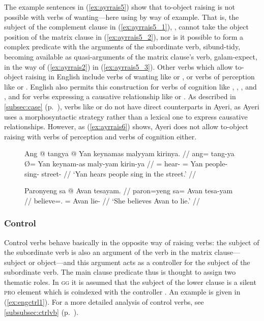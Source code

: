 The example sentences in (\ref{ex:ayrrais5}) show that to-object raising is not
possible with verbs of wanting---here using  by way
of example. That is, the subject of the complement clause in
(\ref{ex:ayrrais5_1}), , cannot take the object position of
the matrix clause in (\ref{ex:ayrrais5_2}), nor is it possible to form a
complex predicate with the arguments of the subordinate verb, 
{sibund-}{tidy}, becoming available as quasi-arguments of the matrix clause's
verb,  {galam-}{expect}, in the way of (\ref{ex:ayrrais2}) in
(\ref{ex:ayrrais5_3}). Other verbs which allow to-object raising in English
include verbs of wanting like  or , or verbs of perception
like  or . English also permits this construction for verbs of
cognition like , , , and , and for
verbs expressing a causative relationship like  or . As
described in \autoref{subsec:case} (p.~\pageref{subsubsec:causative}), verbs
like  or  do not have direct counterparts in Ayeri, as Ayeri
uses a morphosyntactic strategy rather than a lexical one to express causative
relationships. However, as (\ref{ex:ayrrais6}) shows, Ayeri does not allow
to-object raising with verbs of perception and verbs of cognition either.

\begin{figure}
\pex\label{ex:ayrrais6}
\a\label{ex:ayrrais6_1}\ljudge*\begingl
	\gla Ang @ tangya {} @ Yan keynamas malyyam kirinya. //
	\glb ang= tang-ya Ø= Yan keynam-as maly-yam kirin-ya //
	\glc \Aarg{}= hear-\TsgM{} \Top{}= Yan people-\Parg{} sing-\Ptcp{}
		street-\Loc {} //
	\glft `Yan hears people sing in the street.' //
\endgl

\a\label{ex:ayrrais6_2}\ljudge*\begingl
	\gla Paronyeng sa @ Avan tesayam. //
	\glb paron=yeng sa= Avan tesa-yam //
	\glc believe=\TsgF{}.\Aarg{} \Parg{}= Avan lie-\Ptcp{} //
	\glft `She believes Avan to lie.' //
\endgl
\xe
\end{figure}

\subsubsection{Control}
\label{subsubsec:control}

Control verbs behave basically in the opposite way of raising verbs: the
subject of the subordinate verb is also an argument of the verb in the matrix
clause---subject or object---and this argument acts as a controller for the
subject of the subordinate verb. The main clause predicate thus is thought to
assign two thematic roles. In \textsc{gg} it is assumed that the subject of the
lower clause is a silent \textsc{pro} element which is coindexed with the
controller \citep[442--445, 451]{carnie2013}. An example is given in
(\ref{ex:engctrl1}). For a more detailed analysis of control verbs, see
\autoref{subsubsec:ctrlvb} (p.~\pageref{subsubsec:ctrlvb}).

